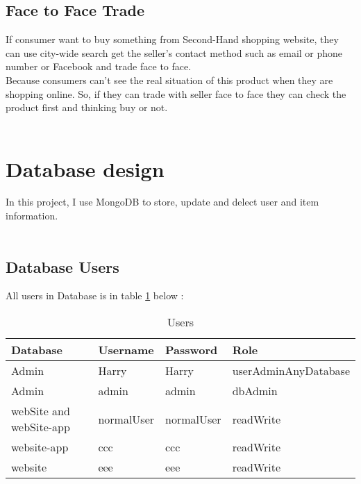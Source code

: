 \subsection{Face to Face Trade}
If consumer want to buy something from Second-Hand shopping website, they can use city-wide search get the seller’s contact method such as email or phone number or Facebook and trade face to face.\\
Because consumers can’t see the real situation of this product when they are shopping online. So, if they can trade with seller face to face they can check the product first and thinking buy or not.\\
\\
\section{Database design}
In this project, I use MongoDB to store, update and delect user and item information.\\
\\
\subsection{Database Users}
All users in Database is in table \ref{tab:3} below :\\
\begin{table}[h]
	\centering
	\begin{tabular}{l | l| l| l}
		Database & Username & Password& Role \\
		\hline
		Admin & Harry & Harry & userAdminAnyDatabase \\
		Admin & admin & admin & dbAdmin\\
		webSite and webSite-app & normalUser & normalUser & readWrite\\
		website-app & ccc & ccc & readWrite\\
		website & eee & eee & readWrite
	\end{tabular}
	\caption{Users}
	\label{tab:3}
\end{table}

